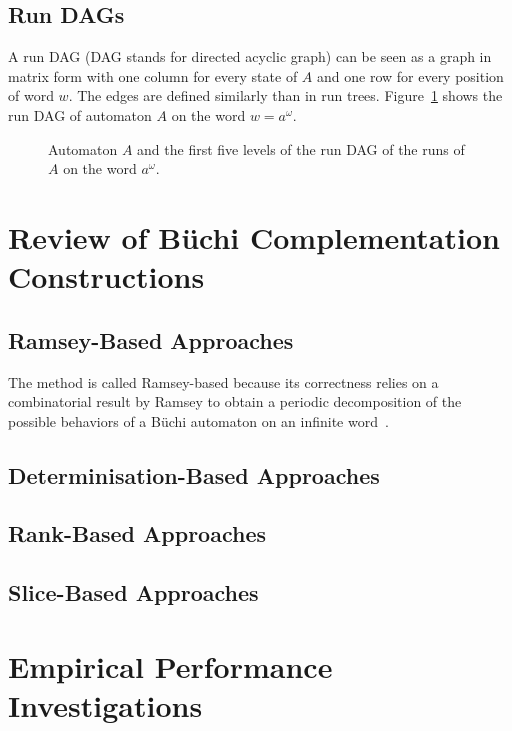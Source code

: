 \subsection{Run DAGs}
A run DAG (DAG stands for directed acyclic graph) can be seen as a graph in matrix form with one column for every state of $A$ and one row for every position of word $w$. The edges are defined similarly than in run trees. Figure~\ref{run_dag} shows the run DAG of automaton $A$ on the word $w = a^\omega$.

\begin{figure}
\begin{center}
\Automaton
\hfil
\RunDAG
\end{center}
\caption{Automaton $A$ and the first five levels of the run DAG of the runs of $A$ on the word $a^\omega$.}
\label{run_dag}
\end{figure} 

\section{Review of Büchi Complementation Constructions}
\label{review}
\subsection{Ramsey-Based Approaches}
\label{ramsey-based}
The method is called Ramsey-based because its correctness relies on a combinatorial result by Ramsey to obtain a periodic decomposition of the possible behaviors of a Büchi automaton on an infinite word~\cite{2012_breuers}.

\subsection{Determinisation-Based Approaches}
\label{det-based}
\subsection{Rank-Based Approaches}
\label{rank-based}
\subsection{Slice-Based Approaches}
\label{slice-based}

\section{Empirical Performance Investigations}
